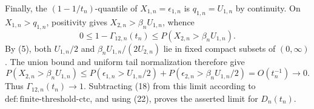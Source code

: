 Finally, the \((1-1/t_n)\)-quantile of \(X_{1,n}=\epsilon_{1,n}\) is \(q_{1,n}=U_{1,n}\) by continuity. On \(X_{1,n}>q_{1,n}\), positivity gives \(X_{2,n}>\beta_nU_{1,n}\), whence
\[
0\leq1-\Gamma_{12,n}(t_n)
\leq P(X_{2,n}>\beta_nU_{1,n}).
\tag{23}
\]
By (5), both \(U_{1,n}/2\) and \(\beta_nU_{1,n}/(2U_{2,n})\) lie in fixed compact subsets of \((0,\infty)\). The union bound and uniform tail normalization therefore give
\[
P(X_{2,n}>\beta_nU_{1,n})
\leq P(\epsilon_{1,n}>U_{1,n}/2)
+P(\epsilon_{2,n}>\beta_nU_{1,n}/2)
=O(t_n^{-1})\to0.
\tag{24}
\]
Thus \(\Gamma_{12,n}(t_n)\to1\). Subtracting (18) from this limit according to \(\mathrm{def{:}finite\text{-}threshold\text{-}ctc}\), and using (22), proves the asserted limit for \(D_n(t_n)\).